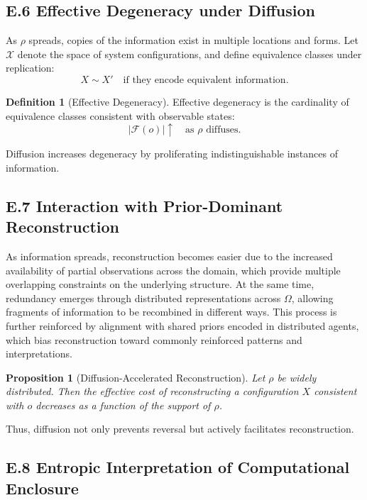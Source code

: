 \documentclass[12pt, oneside]{article}
\theoremstyle{plain}
\newtheorem{proposition}[theorem]{Proposition}
\theoremstyle{definition}
\newtheorem{definition}[theorem]{Definition}
\theoremstyle{remark}
\begin{document}
\subsection{E.6 Effective Degeneracy under Diffusion}

As $\rho$ spreads, copies of the information exist in multiple locations and forms. Let $\mathcal{X}$ denote the space of system configurations, and define equivalence classes under replication:
\[
X \sim X' \quad \text{if they encode equivalent information}.
\]

\begin{definition}[Effective Degeneracy]
Effective degeneracy is the cardinality of equivalence classes consistent with observable states:
\[
|\mathcal{F}(o)| \uparrow \quad \text{as } \rho \text{ diffuses}.
\]
\end{definition}

Diffusion increases degeneracy by proliferating indistinguishable instances of information.

\subsection{E.7 Interaction with Prior-Dominant Reconstruction}

As information spreads, reconstruction becomes easier due to the increased availability of partial observations across the domain, which provide multiple overlapping constraints on the underlying structure. At the same time, redundancy emerges through distributed representations across $\Omega$, allowing fragments of information to be recombined in different ways. This process is further reinforced by alignment with shared priors encoded in distributed agents, which bias reconstruction toward commonly reinforced patterns and interpretations.

\begin{proposition}[Diffusion-Accelerated Reconstruction]
Let $\rho$ be widely distributed. Then the effective cost of reconstructing a configuration $X$ consistent with $o$ decreases as a function of the support of $\rho$.
\end{proposition}

Thus, diffusion not only prevents reversal but actively facilitates reconstruction.

\subsection{E.8 Entropic Interpretation of Computational Enclosure}
\end{document}
